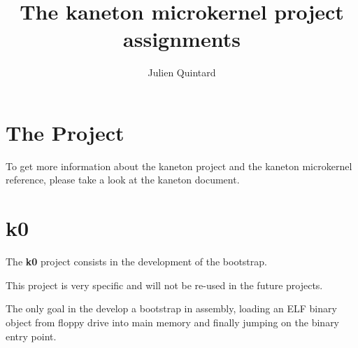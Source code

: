 
%
%



%
%


%
%

\title{The kaneton microkernel project assignments}

%
%

\author{\small{Julien Quintard}}

%
%

\newcommand\prototype[1]{\hspace{1.5cm}#1}

%
%



%
%

\maketitle

%
%

%
%

\section{The Project}

To get more information about the kaneton project and the kaneton
microkernel reference, please take a look at the kaneton document.

%
%

\section{k0}

The \textbf{k0} project consists in the development of the bootstrap.

This project is very specific and will not be re-used in the future
projects.

The only goal in the develop a bootstrap in assembly, loading an ELF
binary object from floppy drive into main memory and finally jumping
on the binary entry point.

